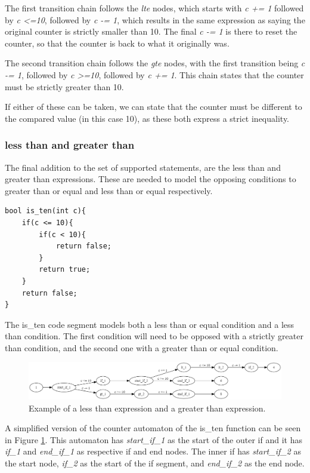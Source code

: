 \documentclass[12pt]{article}
\begin{document}
The first transition chain follows the \textit{lte} nodes, which starts with \textit{c += 1} followed by \textit{c \textless =10}, followed by \textit{c -= 1}, which results in the same expression as saying the original counter is strictly smaller than 10. The final \textit{c -= 1} is there to reset the counter, so that the counter is back to what it originally was. 

The second transition chain follows the \textit{gte} nodes, with the first transition being \textit{c -= 1}, followed by \textit{c \textgreater =10}, followed by \textit{c += 1}. This chain states that the counter must be strictly greater than 10.

If either of these can be taken, we can state that the counter must be different to the compared value (in this case 10), as these both express a strict inequality. 

\subsubsection{less than and greater than}
\label{sec:strict}
The final addition to the set of supported statements, are the less than and greater than expressions. These are needed to model the opposing conditions to greater than or equal and less than or equal respectively.

\begin{lstlisting}[style=CStyle]
bool is_ten(int c){
	if(c <= 10){
		if(c < 10){
			return false;
		}
		return true;
	}
	return false;
}
\end{lstlisting}

The is\_ten code segment models both a less than or equal condition and a less than condition. The first condition will need to be opposed with a strictly greater than condition, and the second one with a greater than or equal condition.

\begin{figure}[h]
	\centering
	\includegraphics[width=\linewidth]{less_than_greater_than}
	\caption{Example of a less than expression and a greater than expression.}
	\label{fig:less_than_greater_than}
\end{figure}

A simplified version of the counter automaton of the is\_ten function can be seen in Figure \ref{fig:less_than_greater_than}. This automaton has \textit{start\_if\_1} as the start of the outer if and it has \textit{if\_1} and \textit{end\_if\_1} as respective if and end nodes. The inner if has \textit{start\_if\_2} as the start node, \textit{if\_2} as the start of the if segment, and \textit{end\_if\_2} as the end node.
\end{document}
